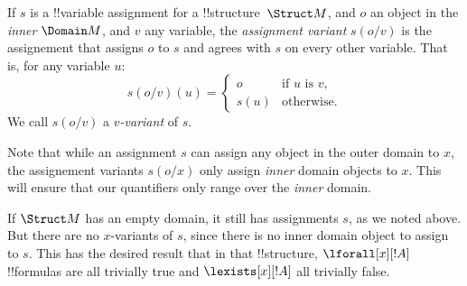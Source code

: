 \documentclass[../../../../include/open-logic-section]{subfiles}
\begin{document}
\begin{defn}
  If $s$ is a !!{variable} assignment for a !!{structure}~$\Struct M$,
  and $o$ an object in the \emph{inner} $\Domain M$, and $v$ any variable, the
  \emph{assignment variant} $s(o/v)$ is the assignement that assigns $o$
  to $s$ and agrees with $s$ on every other variable. That is, for any
  variable $u$:
  $$
  s(o/v)(u)=\begin{cases}
    o & \text{if $u$ is $v$},\\
    s(u) & \text{otherwise}.  
  \end{cases}
  $$
  We call $s(o/v)$ a \emph{$v$-variant} of $s$.
\end{defn}

Note that while an assignment $s$ can assign any object in the outer 
domain to $x$, the assignement variants $s(o/x)$ only assign
\emph{inner} domain objects to $x$. This will ensure that our 
quantifiers only range over the \emph{inner} domain. 

If $\Struct M$ has an empty domain, it still has assignments $s$, as we 
noted above. But there are no $x$-variants of $s$, since there is 
no inner domain object to assign to $s$. This
has the desired result that in that !!{structure},
$\lforall[x][!A]$ !!{formula}s are all trivially true and
$\lexists[x][!A]$ all trivially false. 
\end{document}
